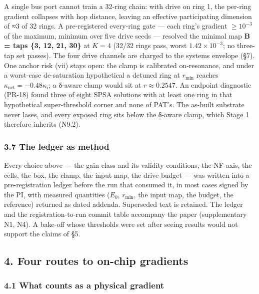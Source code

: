 \documentclass[
  10pt,
]{article}
\newcounter{none} %
\begin{document}
A single bus port cannot train a 32-ring chain: with drive on ring 1,
the per-ring gradient collapses with hop distance, leaving an effective
participating dimension of ≈3 of 32 rings. A pre-registered every-ring
gate --- each ring's gradient \(\ge 10^{-3}\) of the maximum, minimum
over five drive seeds --- resolved the minimal map \textbf{B = taps \{3,
12, 21, 30\}} at \(K=4\) (32/32 rings pass, worst \(1.42\times10^{-3}\);
no three-tap set passes). The four drive channels are charged to the
systems envelope (§7). One anchor risk (vii) stays open: the clamp is
calibrated on-resonance, and under a worst-case de-saturation
hypothetical a detuned ring at \(r_\text{min}\) reaches
\(\kappa_\text{net} = -0.48\kappa_i\); a δ-aware clamp would sit at
\(r \approx 0.2547\). An endpoint diagnostic (PR-18) found three of
eight SPSA solutions with at least one ring in that hypothetical
super-threshold corner and none of PAT's. The as-built substrate never
lases, and every exposed ring sits below the δ-aware clamp, which Stage
1 therefore inherits (N9.2).

\subsubsection{3.7 The ledger as method}\label{the-ledger-as-method}

Every choice above --- the gain class and its validity conditions, the
NF axis, the cells, the box, the clamp, the input map, the drive budget
--- was written into a pre-registration ledger before the run that
consumed it, in most cases signed by the PI, with measured quantities
(\(E_0\), \(r_\text{min}\), the input map, the budget, the reference)
returned as dated addenda. Superseded text is retained. The ledger and
the registration-to-run commit table accompany the paper (supplementary
N1, N4). A bake-off whose thresholds were set after seeing results would
not support the claims of §5.

\subsection{4. Four routes to on-chip
gradients}\label{four-routes-to-on-chip-gradients}

\subsubsection{4.1 What counts as a physical
gradient}\label{what-counts-as-a-physical-gradient}
\end{document}
